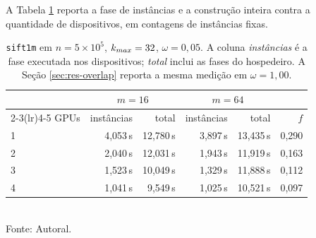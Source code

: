 A Tabela \ref{tab:scaling} reporta a fase de instâncias e a construção inteira contra a quantidade de dispositivos, em contagens de instâncias fixas.\\

\begin{table}[htb!]
\caption{\label{tab:scaling} \texttt{sift1m} em $n = 5 \times 10^5$, $k_{max} = 32$, $\omega = 0{,}05$. A coluna \textit{instâncias} é a fase executada nos dispositivos; \textit{total} inclui as fases do hospedeiro. A Seção \ref{sec:res-overlap} reporta a mesma medição em $\omega = 1{,}00$.}
\centering
\footnotesize
\begin{tabular}{@{}lrrrrr@{}}
\toprule
 & \multicolumn{2}{c}{$m = 16$} & \multicolumn{2}{c}{$m = 64$} & \\
\cmidrule(lr){2-3}\cmidrule(lr){4-5}
\ac{GPU}s & instâncias & total & instâncias & total & $f$ \\
\midrule
1 & 4,053\,s & 12,780\,s & 3,897\,s & 13,435\,s & 0,290 \\
2 & 2,040\,s & 12,031\,s & 1,943\,s & 11,919\,s & 0,163 \\
3 & 1,523\,s & 10,049\,s & 1,329\,s & 11,888\,s & 0,112 \\
4 & 1,041\,s & 9,549\,s & 1,025\,s & 10,521\,s & 0,097 \\
\bottomrule
\end{tabular}\\
Fonte: Autoral.
\end{table}


